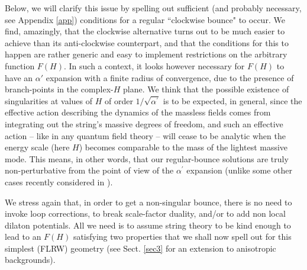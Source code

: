 \documentclass[a4paper,11pt]{article}
\def \ap {\alpha^{\prime}}
\begin{document}
 Below, we will clarify this issue by spelling out  sufficient (and probably necessary, see Appendix \ref{app}) conditions for a regular ``clockwise bounce" to occur. We find,
amazingly, that the clockwise alternative turns out to be much easier to achieve than its anti-clockwise counterpart, and that the conditions for this to happen are rather generic and easy to implement restrictions on the arbitrary function $F(H)$. In such a context, 
it looks however necessary for $F(H)$ to have an $\alpha'$ expansion with a finite radius of convergence, due to the presence of branch-points in the complex-$H$ plane.  We think that the possible existence of singularities at values of $H$ of order $1/\sqrt{\ap}$ is to be expected, in general, since the effective action describing the dynamics of the massless fields comes from integrating out the string's massive degrees of freedom, and such an effective action -- like in any quantum field theory -- will cease to be analytic when the energy scale (here $H$) becomes comparable to the mass of the lightest massive mode. This means, in other words, that our regular-bounce solutions are truly non-perturbative from the point of view of the $\ap$ expansion (unlike some other cases recently considered in \cite{25}). 

We stress again that, in order to get a non-singular bounce, there is no need to invoke loop corrections, to break scale-factor duality, and/or to add non local dilaton potentials. All we need is to assume string theory to be kind enough to lead to an  $F(H)$ satisfying two properties that we shall now spell out for this simplest (FLRW) geometry (see Sect. \ref{sec3} for an extension to anisotropic backgrounds).
\end{document}
